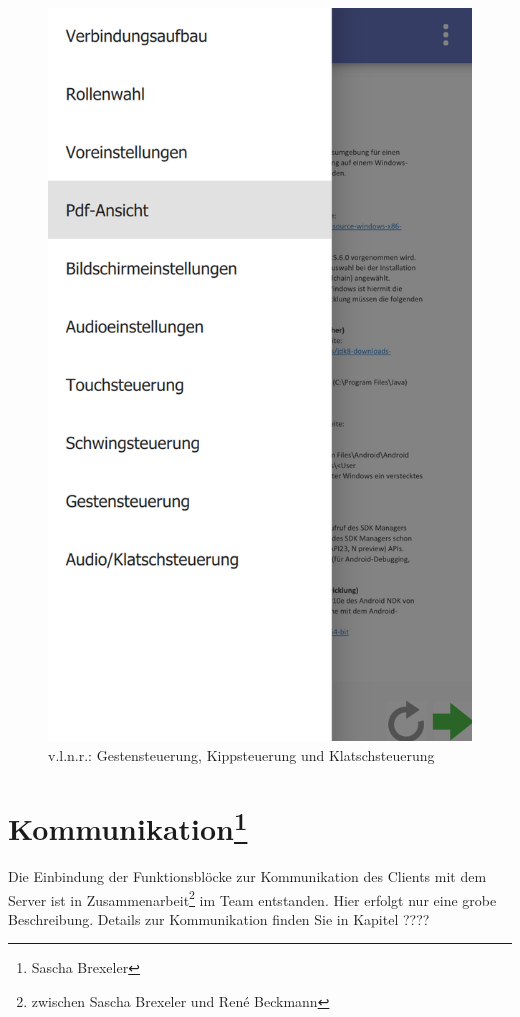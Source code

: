 \begin{figure}[ht!]
\begin{minipage}{0.31\linewidth}
		\includegraphics[scale=0.5]{GUI/Bilder/6_Menu-Button_Drawer_mit_Listview.PNG}
	\end{minipage}
	\caption{v.l.n.r.: Gestensteuerung, Kippsteuerung und Klatschsteuerung{\tiny}}
	\label{client:InformationenBedienhilfen}
\end{figure}


\section[Kommunikation]{Kommunikation\footnote{Sascha Brexeler}}
\label{client_kommunikation}
Die Einbindung der Funktionsblöcke zur Kommunikation des Clients mit dem Server ist in Zusammenarbeit\footnote{zwischen Sascha Brexeler und René Beckmann} im Team entstanden. Hier erfolgt nur eine grobe Beschreibung. Details zur Kommunikation finden Sie in Kapitel ????
